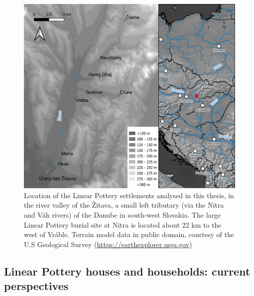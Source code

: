\documentclass[
  12pt,
  a4paper, twoside]{book}
\begin{document}
\begin{figure}

{\centering \includegraphics[width=0.9\linewidth]{Results/fig03_zitava} 

}

\caption[Map with location of analysed Linear Pottery sites]{Location of the Linear Pottery settlements analysed in this thesis, in the river valley of the Žitava, a small left tributary (via the Nitra and Váh rivers) of the Danube in south-west Slovakia. The large Linear Pottery burial site at Nitra is located about 22 km to the west of Vráble. Terrain model data in public domain, courtesy of the U.S Geological Survey (\url{https://earthexplorer.usgs.gov})}\label{fig:03-zitava}
\end{figure}

\hypertarget{linear-pottery-houses-and-households-current-perspectives}{%
\subsection{Linear Pottery houses and households: current perspectives}\label{linear-pottery-houses-and-households-current-perspectives}}
\end{document}
